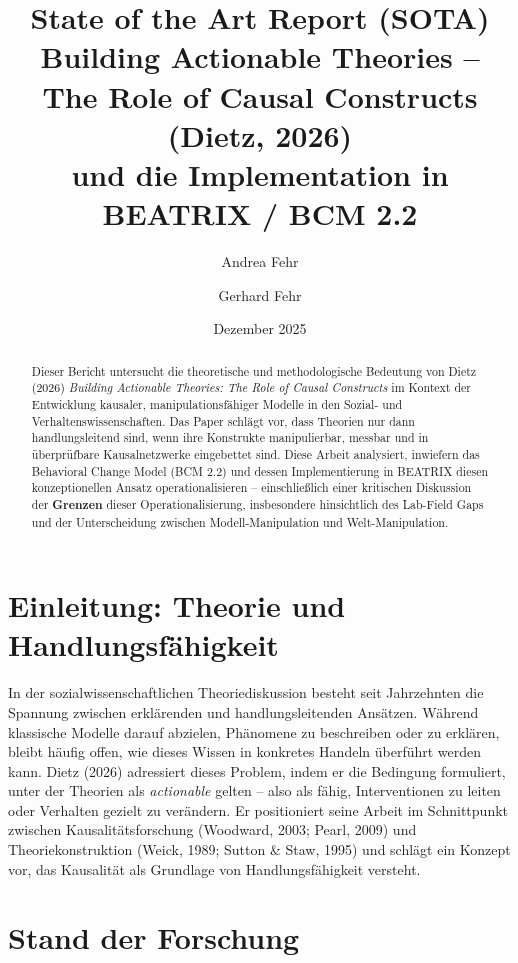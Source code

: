 \documentclass[12pt,a4paper]{article}
\title{
{\LARGE\bfseries State of the Art Report (SOTA)}\\[0.4cm]
{\Large Building Actionable Theories -- The Role of Causal Constructs (Dietz, 2026)}\\[0.2cm]
{\large und die Implementation in BEATRIX / BCM 2.2}
}
\author[1]{Andrea Fehr}
\author[1]{Gerhard Fehr}
\affil[1]{FehrAdvice \& Partners AG, Zürich}
\date{Dezember 2025}
\begin{document}
\maketitle

\begin{abstract}
Dieser Bericht untersucht die theoretische und methodologische Bedeutung von Dietz (2026) \textit{Building Actionable Theories: The Role of Causal Constructs} im Kontext der Entwicklung kausaler, manipulationsfähiger Modelle in den Sozial- und Verhaltenswissenschaften.
Das Paper schlägt vor, dass Theorien nur dann handlungsleitend sind, wenn ihre Konstrukte manipulierbar, messbar und in überprüfbare Kausalnetzwerke eingebettet sind.
Diese Arbeit analysiert, inwiefern das Behavioral Change Model (BCM 2.2) und dessen Implementierung in BEATRIX diesen konzeptionellen Ansatz operationalisieren -- einschließlich einer kritischen Diskussion der \textbf{Grenzen} dieser Operationalisierung, insbesondere hinsichtlich des Lab-Field Gaps und der Unterscheidung zwischen Modell-Manipulation und Welt-Manipulation.
\end{abstract}

\section{Einleitung: Theorie und Handlungsfähigkeit}

In der sozialwissenschaftlichen Theoriediskussion besteht seit Jahrzehnten die Spannung zwischen erklärenden und handlungsleitenden Ansätzen.
Während klassische Modelle darauf abzielen, Phänomene zu beschreiben oder zu erklären, bleibt häufig offen, wie dieses Wissen in konkretes Handeln überführt werden kann.
Dietz (2026) adressiert dieses Problem, indem er die Bedingung formuliert, unter der Theorien als \textit{actionable} gelten -- also als fähig, Interventionen zu leiten oder Verhalten gezielt zu verändern.
Er positioniert seine Arbeit im Schnittpunkt zwischen Kausalitätsforschung (Woodward, 2003; Pearl, 2009) und Theoriekonstruktion (Weick, 1989; Sutton \& Staw, 1995) und schlägt ein Konzept vor, das Kausalität als Grundlage von Handlungsfähigkeit versteht.

\section{Stand der Forschung}
\end{document}
